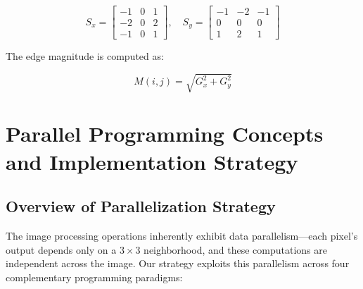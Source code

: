 \documentclass[12pt,a4paper]{report}
\begin{document}
\begin{equation}
S_x = \begin{bmatrix} -1 & 0 & 1 \\ -2 & 0 & 2 \\ -1 & 0 & 1 \end{bmatrix}, \quad
S_y = \begin{bmatrix} -1 & -2 & -1 \\ 0 & 0 & 0 \\ 1 & 2 & 1 \end{bmatrix}
\end{equation}

The edge magnitude is computed as:

\begin{equation}
M(i,j) = \sqrt{G_x^2 + G_y^2}
\end{equation}



\newpage

\chapter{Parallel Programming Concepts and Implementation Strategy}

\section{Overview of Parallelization Strategy}

The image processing operations inherently exhibit data parallelism---each pixel's output depends only on a $3 \times 3$ neighborhood, and these computations are independent across the image. Our strategy exploits this parallelism across four complementary programming paradigms:
\end{document}
